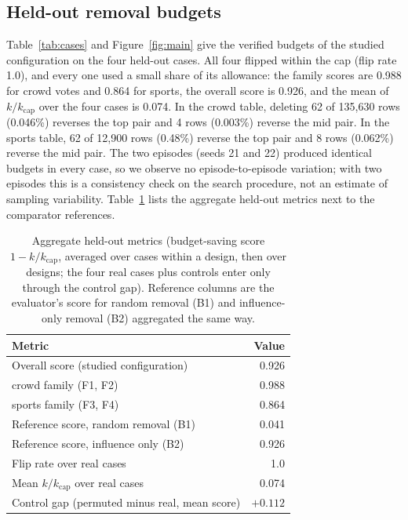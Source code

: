 \documentclass{article}
\newcommand{\kcap}{k_{\mathrm{cap}}}
\begin{document}
\subsection{Held-out removal budgets}
Table~\ref{tab:cases} and Figure~\ref{fig:main} give the verified budgets of the studied configuration on the four held-out cases. All four flipped within the cap (flip rate 1.0), and every one used a small share of its allowance: the family scores are 0.988 for crowd votes and 0.864 for sports, the overall score is 0.926, and the mean of $k/\kcap$ over the four cases is 0.074. %
In the crowd table, deleting 62 of 135,630 rows (0.046\%) reverses the top pair and 4 rows (0.003\%) reverse the mid pair. In the sports table, 62 of 12,900 rows (0.48\%) reverse the top pair and 8 rows (0.062\%) reverse the mid pair. %
The two episodes (seeds 21 and 22) produced identical budgets in every case, so we observe no episode-to-episode variation; with two episodes this is a consistency check on the search procedure, not an estimate of sampling variability. Table~\ref{tab:agg} lists the aggregate held-out metrics next to the comparator references.

\begin{table}[t]
\centering
\caption{Aggregate held-out metrics (budget-saving score $1-k/\kcap$, averaged over cases within a design, then over designs; the four real cases plus controls enter only through the control gap). Reference columns are the evaluator's score for random removal (B1) and influence-only removal (B2) aggregated the same way.}
\label{tab:agg}
\small
\begin{tabular}{lr}
\toprule
Metric & Value\\
\midrule
Overall score (studied configuration) & 0.926\\
\quad crowd family (F1, F2) & 0.988\\
\quad sports family (F3, F4) & 0.864\\
Reference score, random removal (B1) & 0.041\\
Reference score, influence only (B2) & 0.926\\
Flip rate over real cases & 1.0\\
Mean $k/\kcap$ over real cases & 0.074\\
Control gap (permuted minus real, mean score) & $+0.112$\\
\bottomrule
\end{tabular}
\end{table}
\end{document}
